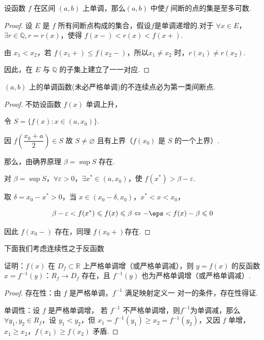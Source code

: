 \begin{proposition}
	设函数 $f$ 在区间 $(a, b)$ 上单调，那么$(a, b)$ 中使$f$ 间断的点的集是至多可数.
\end{proposition}

\begin{proof}
	设 $E$ 是 $f$ 所有间断点构成的集合，假设$f$是单调递增的.对于 $\forall x \in E$，$\exists r \in \mathbb{Q},r=r(x)$，使得 $f(x-) < r(x) < f(x+)$.
	
	由 $x_1 < x_2$，若 $f(x_1+) \leqslant f(x_2-)$，所以$x_1 \neq x_2$ 时，$r(x_1) \neq r(x_2)$.
	
	因此，在 $E$ 与 $\mathbb{Q}$ 的子集上建立了一一对应.
\end{proof}
\begin{proposition}
	$(a, b)$ 上的单调函数(未必严格单调)的不连续点必为第一类间断点.
	\label{monouni}
	
\end{proposition}
\begin{proof}
	不妨设函数 $f(x)$ 单调上升，
	
	令 $S = \{ f(x): x \in (a, x_0) \}$.
	
	因 $f\left(\dfrac{x_0 + a}{2}\right) \in S$ 故 $S \neq \varnothing$ 且有上界（$f(x_0)$ 是 $S$ 的一个上界）.
	
	那么，由确界原理 $\beta = \sup S$ 存在.
	
	对 $\beta = \sup S$，$\forall \varepsilon > 0$，$\exists x^* \in (a, x_0)$，使 $f(x^*) > \beta - \varepsilon$.
	
	取 $\delta = x_0 - x^* > 0$，当 $x \in (x_0 - \delta, x_0)$，$x^* < x < x_0$，
	
	$$\beta - \varepsilon < f(x^*) \leqslant f(x) \leqslant \beta \Leftrightarrow-\eps<f(x)-\beta\leqslant0$$
	
	因此 $f(x_0-)$ 存在，同理 $f(x_0+)$存在.
\end{proof}
下面我们考虑连续性之于反函数
\begin{proposition}\label{infunex}
	证明：$f(x)$ 在 $D_f \subset \mathbb{R}$ 上严格单调增（或严格单调减），则 $y = f(x)$ 的反函数 $x = f^{-1}(y)$：$R_f \to D_f$ 存在，且 $f^{-1}(y)$ 也为严格单调增（或严格单调减）.
	
\end{proposition}
\begin{proof}
	
	存在性：由 $f$ 是严格单调，$f^{-1}$ 满足映射定义一 对一的条件，存在性得证.
	
	单调性：设 $f$ 是严格单调增，
	若 $f^{-1}$ 不严格单调增，则$f^{-1}$为单调减，那么 $\forall y_1, y_2 \in R_f$，设 $y_1 < y_2$，但 $x_1 = f^{-1}(y_1) \geqslant x_2 = f^{-1}(y_2)$，又因 $f$ 单增，$x_1 \geqslant x_2$，$f(x_1) \geqslant f(x_2)$ 矛盾.
	
\end{proof}
